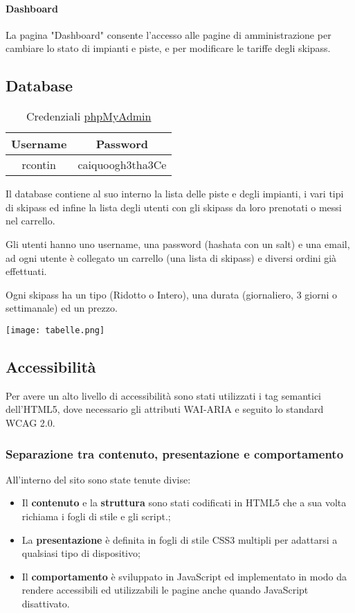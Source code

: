 \paragraph{Dashboard}
La pagina "Dashboard" consente l'accesso alle pagine di amministrazione per cambiare lo stato di impianti e piste, e per modificare le tariffe degli skipass.

\pagebreak
\subsection{Database}
\begin{table}[H]
    \centering
    \begin{tabular}{|c|c|}
        \hline
        \rowcolor[HTML]{96FFFB} 
        \textbf{Username} & \textbf{Password} \\ \hline
        rcontin & caiquoogh3tha3Ce \\ \hline
    \end{tabular}
    \caption{Credenziali \href{http://tecweb.studenti.math.unipd.it/phpmyadmin}{phpMyAdmin}}
\end{table}
Il database contiene al suo interno la lista delle piste e degli impianti, i vari tipi di skipass ed infine la lista degli utenti con gli skipass da loro prenotati o messi nel carrello.

Gli utenti hanno uno username, una password (hashata con un salt) e una email, ad ogni utente è collegato un carrello (una lista di skipass) e diversi ordini già effettuati.

Ogni skipass ha un tipo (Ridotto o Intero), una durata (giornaliero, 3 giorni o settimanale) ed un prezzo.


\texttt{[image: tabelle.png]}



\subsection{Accessibilità}
Per avere un alto livello di accessibilità sono stati utilizzati i tag semantici dell'HTML5, dove necessario gli attributi WAI-ARIA e seguito lo standard WCAG 2.0.
\subsubsection{Separazione tra contenuto, presentazione e comportamento}
All'interno del sito sono state tenute divise:
\begin{itemize}
    \item 
        Il \textbf{contenuto} e la \textbf{struttura} sono stati codificati in HTML5 che a sua volta richiama i fogli di stile e gli script.;
    \item 
        La \textbf{presentazione} è definita in fogli di stile CSS3 multipli per adattarsi a qualsiasi tipo di dispositivo;
    \item 
        Il \textbf{comportamento} è sviluppato in JavaScript ed implementato in modo da rendere accessibili ed utilizzabili le pagine anche quando JavaScript disattivato.
\end{itemize}

